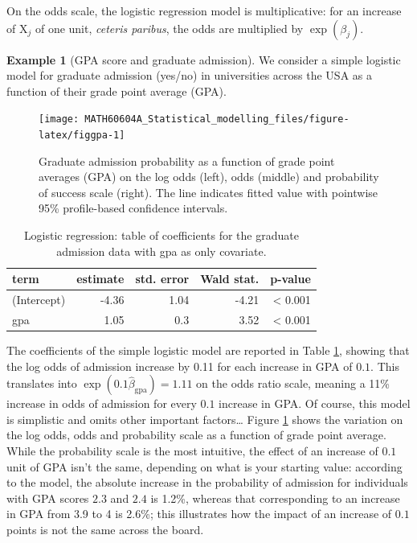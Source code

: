 \documentclass[
  11pt,
  letterpaper,
]{book}
\theoremstyle{definition}
\theoremstyle{definition}
\newtheorem{example}{Example}[chapter]
\theoremstyle{definition}
\theoremstyle{remark}
\begin{document}
On the odds scale, the logistic regression model is multiplicative: for an increase of \(\mathrm{X}_j\) of one unit, \emph{ceteris paribus}, the odds are multiplied by \(\exp(\beta_j)\).

\begin{example}[GPA score and graduate admission]
\protect\hypertarget{exm:gpaexample}{}{\label{exm:gpaexample} {} }We consider a simple logistic model for graduate admission (yes/no) in universities across the USA as a function of their grade point average (GPA).
\end{example}

\begin{figure}

{\centering \texttt{[image: MATH60604A\_Statistical\_modelling\_files/figure-latex/figgpa-1]} 

}

\caption{Graduate admission probability as a function of grade point averages (GPA) on the log odds (left), odds (middle) and probability of success scale (right). The line indicates fitted value with pointwise 95\% profile-based confidence intervals.}\label{fig:figgpa}
\end{figure}

\begin{table}

\caption{\label{tab:gpatable}Logistic regression: table of coefficients for the graduate admission data with gpa as only covariate.}
\centering
\begin{tabular}[t]{lrrrr}
\toprule
term & estimate & std. error & Wald stat. & p-value\\
\midrule
(Intercept) & -4.36 & 1.04 & -4.21 & < 0.001\\
gpa & 1.05 & 0.3 & 3.52 & < 0.001\\
\bottomrule
\end{tabular}
\end{table}

The coefficients of the simple logistic model are reported in Table \ref{tab:gpatable}, showing that the log odds of admission increase by 0.11 for each increase in GPA of \(0.1\). This translates into \(\exp(0.1\widehat{\beta}_{\mathrm{gpa}})=1.11\) on the odds ratio scale, meaning a 11\% increase in odds of admission for every \(0.1\) increase in GPA. Of course, this model is simplistic and omits other important factors\ldots{} Figure \ref{fig:figgpa} shows the variation on the log odds, odds and probability scale as a function of grade point average. While the probability scale is the most intuitive, the effect of an increase of \(0.1\) unit of GPA isn't the same, depending on what is your starting value: according to the model, the absolute increase in the probability of admission for individuals with GPA scores \(2.3\) and \(2.4\) is 1.2\%, whereas that corresponding to an increase in GPA from 3.9 to 4 is 2.6\%; this illustrates how the impact of an increase of \(0.1\) points is not the same across the board.
\end{document}
